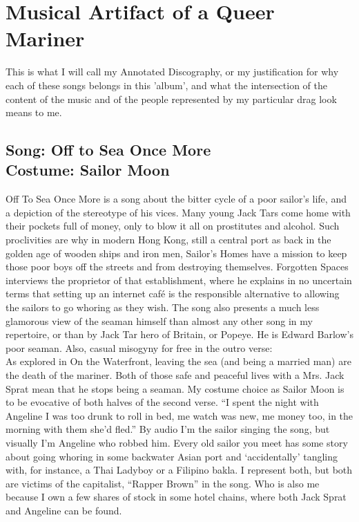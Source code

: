 \documentclass{article}[12pt,letterpaper]
\begin{document}
\section{Musical Artifact of a Queer Mariner}
This is what I will call my Annotated Discography, or my justification for why each of these songs belongs in this 'album', and what the intersection of the content of the music and of the people represented by my particular drag look means to me.
\subsection{Song: Off to Sea Once More\\
Costume: Sailor Moon}
	Off To Sea Once More is a song about the bitter cycle of a poor sailor’s life, and a depiction of the stereotype of his vices. Many young Jack Tars come home with their pockets full of money, only to blow it all on prostitutes and alcohol. Such proclivities are why in modern Hong Kong, still a central port as back in the golden age of wooden ships and iron men, Sailor’s Homes have a mission to keep those poor boys off the streets and from destroying themselves. Forgotten Spaces interviews the proprietor of that establishment, where he explains in no uncertain terms that setting up an internet café is the responsible alternative to allowing the sailors to go whoring as they wish. The song also presents a much less glamorous view of the seaman himself than almost any other song in my repertoire, or than by Jack Tar hero of Britain, or Popeye. He is Edward Barlow’s poor seaman. Also, casual misogyny for free in the outro verse: \\
As explored in On the Waterfront, leaving the sea (and being a married man) are the death of the mariner. Both of those safe and peaceful lives with a Mrs. Jack Sprat mean that he stops being a seaman. 
	My costume choice as Sailor Moon is to be evocative of both halves of the second verse. “I spent the night with Angeline I was too drunk to roll in bed, me watch was new, me money too, in the morning with them she’d fled.” By audio I’m the sailor singing the song, but visually I’m Angeline who robbed him. Every old sailor you meet has some story about going whoring in some backwater Asian port and ‘accidentally’ tangling with, for instance, a Thai Ladyboy or a Filipino bakla. I represent both, but both are victims of the capitalist, “Rapper Brown” in the song. Who is also me because I own a few shares of stock in some hotel chains, where both Jack Sprat and Angeline can be found.
\end{document}
